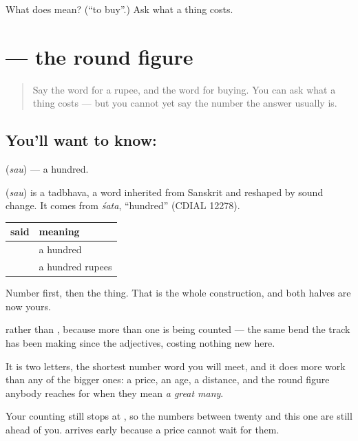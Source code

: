 \begin{tcolorbox}[breakable,colback=teal!4,colframe=teal!35!black,title={Before you move on}]
What does  mean? (\textquotedblleft{}to buy\textquotedblright{}.) Ask what a thing costs.
\end{tcolorbox}
\section[\texorpdfstring{\hi{सौ} (sau)}{सौ (sau)}]{ — the round figure}

\label{lesson:HI-C72-sau}



\begin{quote}
Say the word for a rupee, and the word for buying. You can ask what a thing costs — but you cannot yet say the number the answer usually is.
\end{quote}

\subsection*{You'll want to know: }
\textbf{} (\emph{sau}) — a hundred.

\begin{cousinweb}
\textbf{} (\emph{sau}) is a tadbhava, a word inherited from Sanskrit and reshaped by sound change. It comes from \emph{śata}, \textquotedblleft{}hundred\textquotedblright{} (CDIAL 12278).
\end{cousinweb}

\begin{grammarlens}[title={Grammar Lens: two letters, and the number a price lands on}]
\noindent
\begin{tabularx}{\linewidth}{@{}>{\raggedright\arraybackslash}X>{\raggedright\arraybackslash}X@{}}
\toprule
\textbf{said} & \textbf{meaning} \\
\midrule
\hi{सौ} & a hundred \\
\hi{सौ} \hi{रुपये} & a hundred rupees \\
\bottomrule
\end{tabularx}

Number first, then the thing. That is the whole construction, and both halves are now yours.

\textbf{} rather than \textbf{}, because more than one is being counted — the same bend the track has been making since the adjectives, costing nothing new here.

It is two letters, the shortest number word you will meet, and it does more work than any of the bigger ones: a price, an age, a distance, and the round figure anybody reaches for when they mean \emph{a great many}.

Your counting still stops at \textbf{}, so the numbers between twenty and this one are still ahead of you. \textbf{} arrives early because a price cannot wait for them.
\end{grammarlens}

